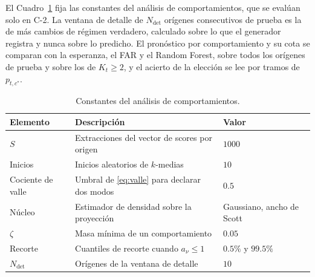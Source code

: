 El Cuadro~\ref{tab:dis_comportamientos} fija las constantes del análisis de comportamientos, que se evalúan solo en C-2. La ventana de detalle de $N_{\mathrm{det}}$ orígenes consecutivos de prueba es la de más cambios de régimen verdadero, calculado sobre lo que el generador registra y nunca sobre lo predicho. El pronóstico por comportamiento y su cota se comparan con la esperanza, el FAR y el Random Forest, sobre todos los orígenes de prueba y sobre los de $K_t \geq 2$, y el acierto de la elección se lee por tramos de $p_{t,c^{*}}$.

\begin{table}[H]
\centering\small
\caption{Constantes del análisis de comportamientos.}
\label{tab:dis_comportamientos}
\begin{tabular}{p{} p{} p{}}
\hline
Elemento & Descripción & Valor \\
\hline
$S$               & Extracciones del vector de scores por origen       & $1000$ \\
Inicios           & Inicios aleatorios de $k$-medias                   & $10$ \\
Cociente de valle & Umbral de \eqref{eq:valle} para declarar dos modos & $0.5$ \\
Núcleo            & Estimador de densidad sobre la proyección          & Gaussiano, ancho de Scott \\
$\zeta$           & Masa mínima de un comportamiento                   & $0.05$ \\
Recorte           & Cuantiles de recorte cuando $a_\nu \leq 1$         & $0.5\%$ y $99.5\%$ \\
$N_{\mathrm{det}}$ & Orígenes de la ventana de detalle                 & $10$ \\
\hline
\end{tabular}
\end{table}
